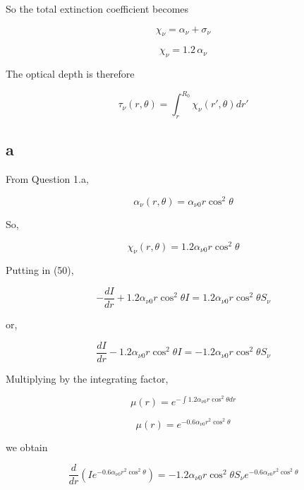 \documentclass{article}
\begin{document}
So the total extinction coefficient becomes

\begin{equation}
\chi_\nu = \alpha_\nu + \sigma_\nu
\end{equation}

\begin{equation}
\chi_\nu = 1.2\,\alpha_\nu
\end{equation}

The optical depth is therefore

\begin{equation}
\tau_\nu(r,\theta)=\int_r^{R_0}\chi_\nu(r',\theta)dr'
\end{equation}

\subsection{a}


From Question 1.a,

\begin{equation}
\alpha_\nu(r,\theta)=\alpha_{\nu0} r\cos^2\theta
\end{equation}

So,

\begin{equation}
\chi_\nu(r,\theta)=1.2\alpha_{\nu0} r\cos^2\theta
\end{equation}

Putting in (50),

\begin{equation}
-\frac{dI}{dr}+1.2\alpha_{\nu0} r\cos^2\theta I
=
1.2\alpha_{\nu0} r\cos^2\theta S_\nu
\end{equation}

or,

\begin{equation}
\frac{dI}{dr}-1.2\alpha_{\nu0} r\cos^2\theta I
=
-1.2\alpha_{\nu0} r\cos^2\theta S_\nu
\end{equation}

Multiplying by the integrating factor,

\begin{equation}
\mu(r)=e^{-\int1.2\alpha_{\nu0} r\cos^2\theta dr}
\end{equation}

\begin{equation}
\mu(r)=e^{-0.6\alpha_{\nu0} r^2\cos^2\theta}
\end{equation}

we obtain

\begin{equation}
\frac{d}{dr}
\left(
I e^{-0.6\alpha_{\nu0} r^2\cos^2\theta}
\right)
=
-1.2\alpha_{\nu0} r\cos^2\theta S_\nu
e^{-0.6\alpha_{\nu0} r^2\cos^2\theta}
\end{equation}
\end{document}
